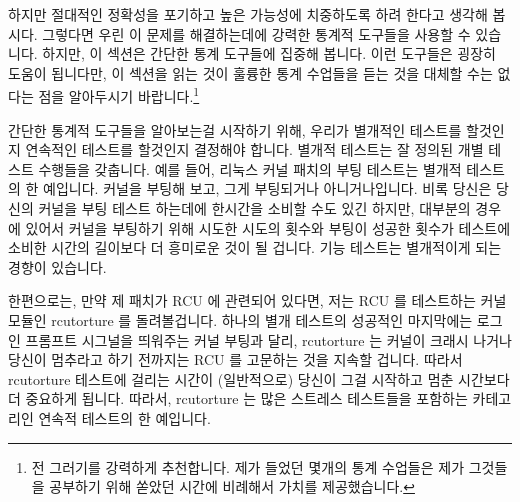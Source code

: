 하지만 절대적인 정확성을 포기하고 높은 가능성에 치중하도록 하려 한다고 생각해 봅시다.
그렇다면 우린 이 문제를 해결하는데에 강력한 통계적 도구들을 사용할 수 있습니다.
하지만, 이 섹션은 간단한 통계 도구들에 집중해 봅니다.
이런 도구들은 굉장히 도움이 됩니다만, 이 섹션을 읽는 것이 훌륭한 통계 수업들을
듣는 것을 대체할 수는 없다는 점을 알아두시기 바랍니다.\footnote{
	전 그러기를 강력하게 추천합니다.
	제가 들었던 몇개의 통계 수업들은 제가 그것들을 공부하기 위해 쏟았던
	시간에 비례해서 가치를 제공했습니다.}

간단한 통계적 도구들을 알아보는걸 시작하기 위해, 우리가 별개적인 테스트를
할것인지 연속적인 테스트를 할것인지 결정해야 합니다.
별개적 테스트는 잘 정의된 개별 테스트 수행들을 갖춥니다.
예를 들어, 리눅스 커널 패치의 부팅 테스트는 별개적 테스트의 한 예입니다.
커널을 부팅해 보고, 그게 부팅되거나 아니거나입니다.
비록 당신은 당신의 커널을 부팅 테스트 하는데에 한시간을 소비할 수도 있긴
하지만, 대부분의 경우에 있어서 커널을 부팅하기 위해 시도한 시도의 횟수와 부팅이
성공한 횟수가 테스트에 소비한 시간의 길이보다 더 흥미로운 것이 될 겁니다.
기능 테스트는 별개적이게 되는 경향이 있습니다.

한편으로는, 만약 제 패치가 RCU 에 관련되어 있다면, 저는 RCU 를 테스트하는 커널
모듈인 rcutorture 를 돌려볼겁니다.
하나의 별개 테스트의 성공적인 마지막에는 로그인 프롬프트 시그널을 띄워주는 커널
부팅과 달리, rcutorture 는 커널이 크래시 나거나 당신이 멈추라고 하기 전까지는
RCU 를 고문하는 것을 지속할 겁니다.
따라서 rcutorture 테스트에 걸리는 시간이 (일반적으로) 당신이 그걸 시작하고 멈춘
시간보다 더 중요하게 됩니다.
따라서, rcutorture 는 많은 스트레스 테스트들을 포함하는 카테고리인 연속적
테스트의 한 예입니다.
\iffalse

